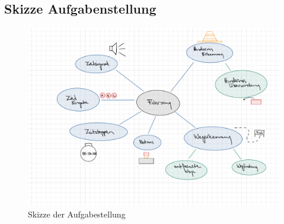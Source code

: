 \newpage
\subsection{Skizze Aufgabenstellung}
\begin{figure}
    \includegraphics[scale=0.2]{assets/Skizze_Aufgabenstellung.pdf}
    \caption{Skizze der Aufgabestellung}
    \label{img:Skizze_Aufgabenstellung}
\end{figure} 
 



